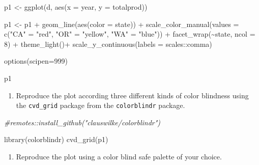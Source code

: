 \documentclass[
]{article}
\newenvironment{Shaded}{\begin{snugshade}}{\end{snugshade}}
\newcommand{\AttributeTok}[1]{\textcolor[rgb]{0.77,0.63,0.00}{#1}}
\newcommand{\CommentTok}[1]{\textcolor[rgb]{0.56,0.35,0.01}{\textit{#1}}}
\newcommand{\DecValTok}[1]{\textcolor[rgb]{0.00,0.00,0.81}{#1}}
\newcommand{\FunctionTok}[1]{\textcolor[rgb]{0.00,0.00,0.00}{#1}}
\newcommand{\NormalTok}[1]{#1}
\newcommand{\OtherTok}[1]{\textcolor[rgb]{0.56,0.35,0.01}{#1}}
\newcommand{\SpecialCharTok}[1]{\textcolor[rgb]{0.00,0.00,0.00}{#1}}
\newcommand{\StringTok}[1]{\textcolor[rgb]{0.31,0.60,0.02}{#1}}
\providecommand{\tightlist}{%
  \setlength{\itemsep}{0pt}\setlength{\parskip}{0pt}}
\begin{document}
\begin{Shaded}
\begin{Highlighting}[]
\NormalTok{p1 }\OtherTok{\textless{}{-}} \FunctionTok{ggplot}\NormalTok{(d, }\FunctionTok{aes}\NormalTok{(}\AttributeTok{x =}\NormalTok{ year, }\AttributeTok{y =}\NormalTok{ totalprod))}

\NormalTok{p1 }\OtherTok{\textless{}{-}}
\NormalTok{  p1 }\SpecialCharTok{+} \FunctionTok{geom\_line}\NormalTok{(}\FunctionTok{aes}\NormalTok{(}\AttributeTok{color =}\NormalTok{ state)) }\SpecialCharTok{+}
   \FunctionTok{scale\_color\_manual}\NormalTok{(}\AttributeTok{values =} \FunctionTok{c}\NormalTok{(}\StringTok{"CA"} \OtherTok{=} \StringTok{"red"}\NormalTok{, }\StringTok{"OR"} \OtherTok{=} \StringTok{"yellow"}\NormalTok{, }
                                \StringTok{"WA"} \OtherTok{=} \StringTok{"blue"}\NormalTok{)) }\SpecialCharTok{+}
  \FunctionTok{facet\_wrap}\NormalTok{(}\SpecialCharTok{\textasciitilde{}}\NormalTok{state, }\AttributeTok{ncol =} \DecValTok{8}\NormalTok{) }\SpecialCharTok{+} 
  \FunctionTok{theme\_light}\NormalTok{()}\SpecialCharTok{+}
  \FunctionTok{scale\_y\_continuous}\NormalTok{(}\AttributeTok{labels =}\NormalTok{ scales}\SpecialCharTok{::}\NormalTok{comma)}

\FunctionTok{options}\NormalTok{(}\AttributeTok{scipen=}\DecValTok{999}\NormalTok{)}

\NormalTok{p1}
\end{Highlighting}
\end{Shaded}

\begin{enumerate}
\def\labelenumi{\arabic{enumi}.}
\setcounter{enumi}{1}
\tightlist
\item
  Reproduce the plot according three different kinds of color blindness
  using the \texttt{cvd\_grid} package from the \texttt{colorblindr}
  package.
\end{enumerate}

\begin{Shaded}
\begin{Highlighting}[]
\CommentTok{\#remotes::install\_github("clauswilke/colorblindr")}

\FunctionTok{library}\NormalTok{(colorblindr)}
\FunctionTok{cvd\_grid}\NormalTok{(p1)}
\end{Highlighting}
\end{Shaded}

\begin{enumerate}
\def\labelenumi{\arabic{enumi}.}
\setcounter{enumi}{2}
\tightlist
\item
  Reproduce the plot using a color blind safe palette of your choice.
\end{enumerate}
\end{document}
